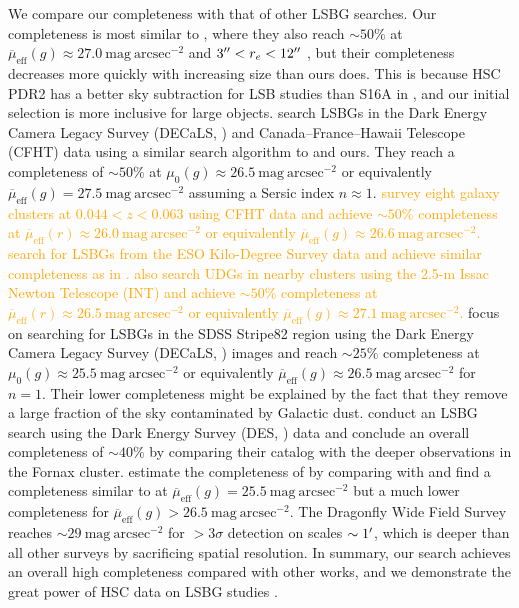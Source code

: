 \documentclass[twocolumn,astrosymb,twocolappendix,linenumbers]{aastex631}
\newcommand{\sbunit}{\mathrm{mag\ arcsec}^{-2}}
\newcommand{\sbeff}{\overline{\mu}_{\mathrm{eff}}(g)}
\newcommand{\sbeffr}{\overline{\mu}_{\mathrm{eff}}(r)}
\newcommand{\emphasize}{\textcolor{orange}}
\begin{document}
\begin{CJK*}{UTF8}{gbsn}
We compare our completeness with that of other LSBG searches. Our completeness is most similar to , where they also reach $\sim 50\%$ at $\sbeff \approx 27.0\ \sbunit$ and $3\mbox{$^{\prime\prime}$} < r_e < 12\mbox{$^{\prime\prime}$}$ \citep{Kado-Fong2021,Greene2022}, but their completeness decreases more quickly with increasing size than ours does. This is because HSC PDR2 has a better sky subtraction for LSB studies than S16A in , and our initial selection is more inclusive for large objects. \citet{CarlstenELVES2022} search LSBGs in the Dark Energy Camera Legacy Survey (DECaLS, \citealt{Dey2019}) and Canada–France–Hawaii Telescope (CFHT) data using a similar search algorithm to  and ours. They reach a completeness of $\sim 50\%$ at $\mu_0(g)\approx 26.5\ \sbunit$ or equivalently $\sbeff = 27.5\ \sbunit$ assuming a Sersic index $n \approx 1$. \emphasize{\citet{vdBurg2016} survey eight galaxy clusters at $0.044 < z < 0.063$ using CFHT data and achieve $\sim 50\%$ completeness at $\sbeffr\approx 26.0\ \sbunit$ or equivalently $\sbeff \approx 26.6\ \sbunit$. \citet{vdBurg2017} search for LSBGs from the ESO Kilo-Degree Survey data and achieve similar completeness as in \citet{vdBurg2016}. \citet{ManceraPina2019a} also search UDGs in nearby clusters using the 2.5-m Issac Newton Telescope (INT) and achieve $\sim 50\%$ completeness at $\sbeffr\approx 26.5\ \sbunit$ or equivalently $\sbeff \approx 27.1\ \sbunit$.} \citet{Zaritsky2021} focus on searching for LSBGs in the SDSS Stripe82 region using the Dark Energy Camera Legacy Survey (DECaLS, \citealt{Dey2019}) images and reach $\sim 25\%$ completeness at $\mu_{0}(g) \approx 25.5\ \sbunit$ or equivalently $\sbeff \approx 26.5\ \sbunit$ for $n=1$. Their lower completeness might be explained by the fact that they remove a large fraction of the sky contaminated by Galactic dust. \citet{Tanoglidis2021} conduct an LSBG search using the Dark Energy Survey (DES, \citealt{Abbot2018}) data and conclude an overall completeness of $\sim 40\%$ by comparing their catalog with the deeper observations in the Fornax cluster. \citet{Kado-Fong2021} estimate the completeness of \citet{Tanoglidis2021} by comparing with  and find a completeness similar to  at $\sbeff = 25.5\ \sbunit$ but a much lower completeness for $\sbeff > 26.5\ \sbunit$. The Dragonfly Wide Field Survey \citep{Danieli2020} reaches $\sim 29\ \sbunit$ for $>3\sigma$ detection on scales $\sim 1\mbox{$^\prime$}$, which is deeper than all other surveys by sacrificing spatial resolution. In summary, our search achieves an overall high completeness compared with other works, and we demonstrate the great power of HSC data on LSBG studies \citep[e.g.,][]{Huang2018,Kado-Fong2018}. 


\end{CJK*}
\end{document}
